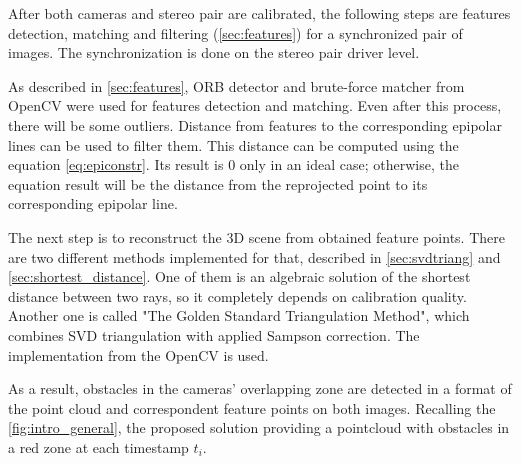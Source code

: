 After both cameras and stereo pair are calibrated, the following steps are features detection, matching and filtering (\autoref{sec:features}) for a synchronized pair of images. 
The synchronization is done on the stereo pair driver level.

As described in \autoref{sec:features}, ORB detector and brute-force matcher from OpenCV were used for features detection and matching.
Even after this process, there will be some outliers.
Distance from features to the corresponding epipolar lines can be used to filter them. 
This distance can be computed using the equation \autoref{eq:epiconstr}.
Its result is $0$ only in an ideal case; otherwise, the equation result will be the distance from the reprojected point to its corresponding epipolar line.

The next step is to reconstruct the 3D scene from obtained feature points.
There are two different methods implemented for that, described in \autoref{sec:svdtriang} and \autoref{sec:shortest_distance}.
One of them is an algebraic solution of the shortest distance between two rays, so it completely depends on calibration quality.
Another one is called "The Golden Standard Triangulation Method", which combines SVD triangulation with applied Sampson correction. 
The implementation from the OpenCV is used.

As a result, obstacles in the cameras' overlapping zone are detected in a format of the point cloud and correspondent feature points on both images.
Recalling the \autoref{fig:intro_general}, the proposed solution providing a pointcloud with obstacles in a red zone at each timestamp $t_i$. 
